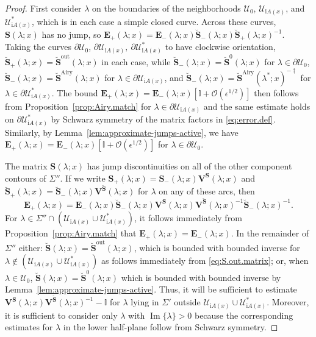 \documentclass[12pt]{amsart}
\numberwithin{equation}{section}
\newcommand{\ii}{\mathrm{i}}
\newcommand{\SP}{\lambda}
\newcommand{\eps}{\epsilon}
\newcommand{\bigo}[1]{ \mathcal{O}\! \left( #1 \right) }
\renewcommand{\Im}{\operatorname{Im}}
\begin{document}
\begin{proof}
First consider $\SP$ on the boundaries of the neighborhoods $\mathcal{U}_0$, $\mathcal{U}_{\ii A(x)}$, and $\mathcal{U}_{\ii A(x)}^*$, which is in each case a simple closed curve. Across these curves, $\mathbf{S}(\SP;x)$ has no jump, so $\mathbf{E}_+(\SP;x) = \mathbf{E}_-(\SP;x) \breve{\mathbf{S}}_-(\SP;x) \breve{\mathbf{S}}_+(\SP;x)^{-1}$. Taking the curves $\partial \mathcal{U}_0$, $\partial \mathcal{U}_{\ii A(x)},\ \partial \mathcal{U}_{\ii A(x)}^*$ to have clockwise orientation, $\breve{\mathbf{S}}_+(\SP;x) = \breve{\mathbf{S}}^{\mathrm{out}}(\SP;x)$ in each case, while $\breve{\mathbf{S}}_-(\SP;x) = \breve {\mathbf{S}}^0(\SP;x)$ for $\SP \in \partial \mathcal{U}_0$, $\breve{\mathbf{S}}_-(\SP;x) = \breve{ \mathbf{S}}^{\mathrm{Airy}}(\SP;x)$ for $\SP \in \partial \mathcal{U}_{\ii A(x)}$, and  $\breve{\mathbf{S}}_-(\SP;x) = \breve{\mathbf{S}}^{\mathrm{Airy}}(\SP^*;x)^{-\dagger}$ for $\SP \in \partial \mathcal{U}_{\ii A(x)}^*$.  The bound 
$\mathbf{E}_+(\SP;x) = \mathbf{E}_-(\SP;x) \left[ \mathbb{I} + \bigo{\eps^{1/2}} \right]$ then follows from Proposition~\ref{prop:Airy.match} for $\lambda \in \partial \mathcal{U}_{\ii A(x)}$ and the same estimate holds on $\partial \mathcal{U}_{\ii A(x)}^*$ by Schwarz symmetry of the matrix factors in \eqref{eq:error.def}. Similarly, by Lemma~\ref{lem:approximate-jumps-active}, we have $\mathbf{E}_+(\SP;x) = \mathbf{E}_-(\SP;x) \left[ \mathbb{I} + \bigo{\eps^{1/2}} \right]$ for $\SP \in \partial \mathcal{U}_0$. 

The matrix $\mathbf{S}(\SP;x)$ has jump discontinuities on all of the other component contours of $\Sigma''$. If we write $\mathbf{S}_+(\SP;x) = \mathbf{S}_-(\SP;x) \mathbf{V}^\mathbf{S}(\SP;x)$ and $\breve{\mathbf{S}}_+(\SP;x) = \breve{\mathbf{S}}_-(\SP;x) \mathbf{V}^{\breve{\mathbf{S}}}(\SP;x)$ for $\SP$ on any of these arcs, then 
\begin{equation}
	\mathbf{E}_+(\SP;x) = \mathbf{E}_-(\SP;x) \breve{\mathbf{S}}_-(\SP;x) \mathbf{V}^\mathbf{S}(\SP;x) \mathbf{V}^{\breve{\mathbf{S}}}(\SP;x)^{-1}\breve{\mathbf{S}}_-(\SP;x)^{-1}.
\end{equation}	
For $\SP \in \Sigma'' \cap \left( \mathcal{U}_{\ii A(x)} \cup \mathcal{U}_{\ii A(x)}^* \right)$, it follows immediately from Proposition~\ref{prop:Airy.match} that $\mathbf{E}_+(\SP;x) = \mathbf{E}_-(\SP;x)$. In the remainder of $\Sigma''$ either:  $\breve{\mathbf{S}}(\SP;x) = \breve{\mathbf{S}}^{\mathrm{out}}(\SP;x)$, which is bounded with bounded inverse for $\SP \not\in \left(\mathcal{U}_{\ii A(x)} \cup \mathcal{U}_{\ii A(x)}^* \right)$ as follows immediately from \eqref{eq:S.out.matrix}; or, when $\SP \in \mathcal{U}_0$, $\breve{\mathbf{S}}(\SP;x) = \breve{\mathbf{S}}^0(\SP;x)$ which is bounded with bounded inverse by Lemma~\ref{lem:approximate-jumps-active}.  Thus, it will be sufficient to estimate $\mathbf{V}^\mathbf{S}(\SP;x) \mathbf{V}^{\breve{\mathbf{S}}}(\SP;x)^{-1} - \mathbb{I}$ for $\SP$ lying in $\Sigma'$ outside $\mathcal{U}_{\ii A(x)} \cup \mathcal{U}_{\ii A(x)}^*$. Moreover, it is sufficient to consider only $\SP$ with $\Im \{ \SP \} >0$ because the corresponding estimates for $\SP$ in the lower half-plane follow from Schwarz symmetry. 


\end{proof}
\end{document}
